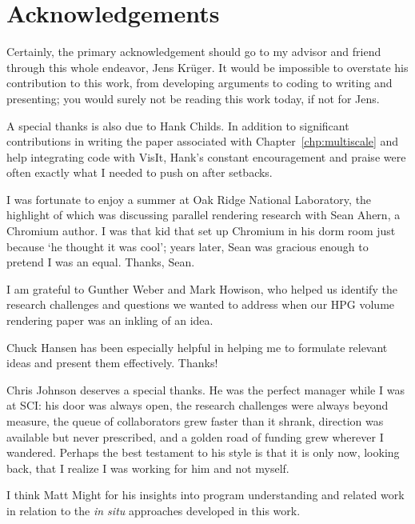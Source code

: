 \section*{Acknowledgements}

Certainly, the primary acknowledgement should go to my advisor and
friend through this whole endeavor, Jens Kr\"uger.  It would be
impossible to overstate his contribution to this work, from developing
arguments to coding to writing and presenting; you would surely not be
reading this work today, if not for Jens.

A special thanks is also due to Hank Childs.  In addition to
significant contributions in writing the paper associated with
Chapter~\ref{chp:multiscale} and help integrating code with VisIt,
Hank's constant encouragement and praise were often exactly what I
needed to push on after setbacks.

I was fortunate to enjoy a summer at Oak Ridge National Laboratory, the
highlight of which was discussing parallel rendering research with Sean
Ahern, a Chromium author.  I was that kid that set up Chromium in his
dorm room just because `he thought it was cool'; years later, Sean was
gracious enough to pretend I was an equal.  Thanks, Sean.

I am grateful to Gunther Weber and Mark Howison, who helped us identify
the research challenges and questions we wanted to address when our HPG
volume rendering paper was an inkling of an idea.

Chuck Hansen has been especially helpful in helping me to formulate
relevant ideas and present them effectively.  Thanks!


Chris Johnson deserves a special thanks.  He was the perfect manager
while I was at SCI: his door was always open, the research challenges
were always beyond measure, the queue of collaborators grew faster than
it shrank, direction was available but never prescribed, and a golden
road of funding grew wherever I wandered.  Perhaps the best testament
to his style is that it is only now, looking back, that I realize I was
working for him and not myself.

I think Matt Might for his insights into program understanding and
related work in relation to the \textit{in situ} approaches developed
in this work.

